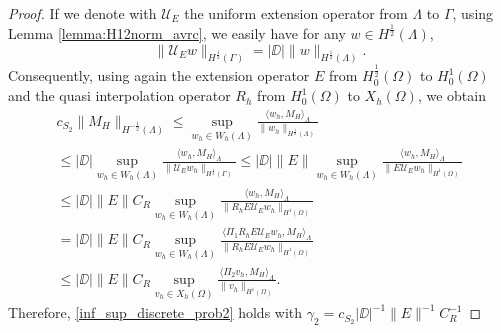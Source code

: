 \begin{proof}
If we denote with $\mathcal{U}_E$ the uniform extension operator from $\Lambda$ to $\Gamma$, using Lemma \ref{lemma:H12norm_avrc}, we easily have for any $w \in H^{\frac 12}(\Lambda)$,
\begin{equation*}
\|\mathcal{U}_E w\|_{H^{\frac 12}(\Gamma)}=|\DD| \|w\|_{H^{\frac 12}(\Lambda)}.
\end{equation*}
Consequently, using again the extension operator $E$ from $H^{\frac 12}_0(\Omega)$ to $H^1_0(\Omega)$ and the quasi interpolation operator $R_h$ from $H^1_0(\Omega)$ to $X_h(\Omega)$, we obtain
\begin{multline}
c_{S_2} \|M_H\|_{H^{-\frac 12}(\Lambda)} \leq 
\sup_{w_h \in W_h(\Lambda)} \frac{ \langle w_h, M_H \rangle_{\Lambda} } {\|w_h\|_{H^{\frac 12}(\Lambda)}} 
\\
\leq |\DD| \sup_{w_h \in W_h(\Lambda)} \frac{ \langle w_h, M_H \rangle _{\Lambda}} {\|\mathcal{U}_E w_h\|_{H^{\frac 12}(\Gamma)}} 
\leq |\DD| \|E\| \sup_{w_h \in W_h(\Lambda)} \frac{ \langle w_h, M_H \rangle _{\Lambda} } {\|E \mathcal{U}_E w_h\|_{H^1(\Omega)}} 
\\
\leq |\DD|\|E\| C_R \sup_{w_h \in W_h(\Lambda)} \frac{ \langle w_h, M_H \rangle _{\Lambda} } {\|R_h E \mathcal{U}_E w_h\|_{H^1(\Omega)}}
\\ 
=  |\DD| \|E\| C_R \sup_{w_h \in W_h(\Lambda)} \frac{ \langle \Pi _1  R_h E \mathcal{U}_E w_h, M_H \rangle _{\Lambda}} {\|R_h E \mathcal{U}_E w_h\|_{H^1(\Omega)}}
\\
\leq |\DD| \|E\| C_R \sup_{v_h \in X_h(\Omega)} \frac{ \langle \Pi _2  v_h, M_H \rangle _{\Lambda}} {\|v_h\|_{H^1(\Omega)}}. 
\end{multline}
Therefore, \eqref{inf_sup_discrete_prob2} holds with $\gamma_2=  c_{S_2} |\DD|^{-1} \|E\|^{-1} C_R^{-1}$
\end{proof}
